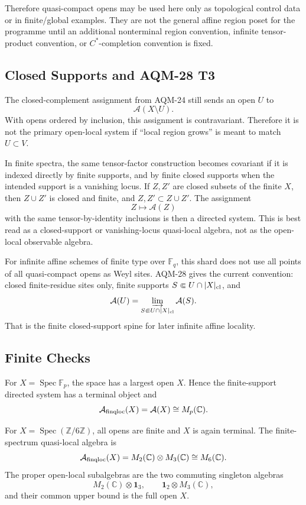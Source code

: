 Therefore quasi-compact opens may be used here only as topological control data
or in finite/global examples.  They are not the general affine region poset for
the programme until an additional nonterminal region convention, infinite
tensor-product convention, or \(C^*\)-completion convention is fixed.

\subsection{Closed Supports and AQM-28 T3}

The closed-complement assignment from AQM-24 still sends an open \(U\) to
\[
  \mathcal A(X\setminus U).
\]
With opens ordered by inclusion, this assignment is contravariant.  Therefore
it is not the primary open-local system if ``local region grows'' is meant to
match \(U\subset V\).

In finite spectra, the same tensor-factor construction becomes covariant if it
is indexed directly by finite supports, and by finite closed supports when the
intended support is a vanishing locus.  If \(Z,Z'\) are closed subsets of the
finite \(X\), then \(Z\cup Z'\) is closed and finite, and
\(Z,Z'\subset Z\cup Z'\).  The assignment
\[
  Z\longmapsto\mathcal A(Z)
\]
with the same tensor-by-identity inclusions is then a directed system.  This is
best read as a closed-support or vanishing-locus quasi-local algebra, not as
the open-local observable algebra.

For infinite affine schemes of finite type over \(\mathbb F_q\), this shard
does not use all points of all quasi-compact opens as Weyl sites.  AQM-28 gives
the current convention: closed finite-residue sites only, finite supports
\(S\Subset U\cap |X|_{\rm cl}\), and
\[
  \mathcal A(U)
  =
  \varinjlim_{S\Subset U\cap |X|_{\rm cl}}\mathcal A(S).
\]
That is the finite closed-support spine for later infinite affine locality.

\subsection{Finite Checks}

For \(X=\operatorname{Spec}\mathbb F_p\), the space has a largest open
\(X\).  Hence the finite-support directed system has a terminal object and
\[
  \mathcal A_{\rm finqloc}(X)=\mathcal A(X)\cong M_p(\mathbb C).
\]

For \(X=\operatorname{Spec}(\mathbb Z/6\mathbb Z)\), all opens are
finite and \(X\) is again terminal.  The finite-spectrum quasi-local algebra is
\[
  \mathcal A_{\rm finqloc}(X)
  =
  M_2(\mathbb C)\otimes M_3(\mathbb C)\cong M_6(\mathbb C).
\]
The proper open-local subalgebras are the two commuting singleton algebras
\[
  M_2(\mathbb C)\otimes\mathbf 1_3,\qquad
  \mathbf 1_2\otimes M_3(\mathbb C),
\]
and their common upper bound is the full open \(X\).

